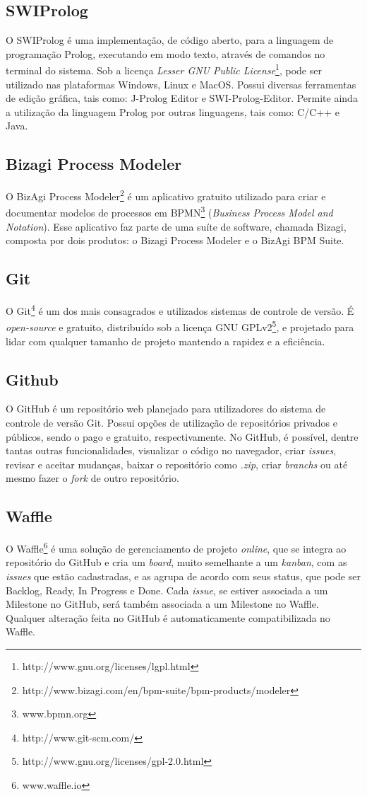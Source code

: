 \subsection{SWIProlog}
O SWIProlog é uma implementação, de código aberto, para a linguagem de programação Prolog, executando em modo texto, através de comandos no terminal do sistema. Sob a licença \textit{Lesser GNU Public License}\footnote{http://www.gnu.org/licenses/lgpl.html}, pode ser utilizado nas plataformas Windows, Linux e MacOS. Possui diversas ferramentas de edição gráfica, tais como: J-Prolog Editor e SWI-Prolog-Editor.
Permite ainda a utilização da linguagem Prolog por outras linguagens, tais como: C/C++ e Java.

\subsection{Bizagi Process Modeler}
O BizAgi Process Modeler\footnote{http://www.bizagi.com/en/bpm-suite/bpm-products/modeler} é um aplicativo gratuito utilizado para criar e documentar modelos de processos em BPMN\footnote{www.bpmn.org} (\textit{Business Process Model and Notation}). Esse aplicativo faz parte de uma suíte de software, chamada Bizagi, composta por dois produtos: o Bizagi Process Modeler e o BizAgi BPM Suite. 

\subsection{Git}
O Git\footnote{http://www.git-scm.com/} é um dos mais consagrados e utilizados sistemas de controle de versão. É \textit{open-source} e gratuito, distribuído sob a licença GNU GPLv2\footnote{http://www.gnu.org/licenses/gpl-2.0.html}, e projetado para lidar com qualquer tamanho de projeto mantendo a rapidez e a eficiência. 

\subsection{Github}
O GitHub é um repositório web planejado para utilizadores do sistema de controle de versão Git. Possui opções de utilização de repositórios privados e públicos, sendo o pago e gratuito, respectivamente.
No GitHub, é possível, dentre tantas outras funcionalidades, visualizar o código no navegador, criar \textit{issues}, revisar e aceitar mudanças, baixar o repositório como \textit{.zip}, criar \textit{branchs} ou até mesmo fazer o \textit{fork} de outro repositório.

\subsection{Waffle}
O Waffle\footnote{www.waffle.io} é uma solução de gerenciamento de projeto \textit{online}, que se integra ao repositório do GitHub e cria um \textit{board}, muito semelhante a um \textit{kanban}, com as \textit{issues} que estão cadastradas, e as agrupa de acordo com seus status, que pode ser Backlog, Ready, In Progress  e Done. Cada \textit{issue}, se estiver associada a um Milestone no GitHub, será também associada a um Milestone no Waffle. Qualquer alteração feita no GitHub é automaticamente compatibilizada no Waffle.

